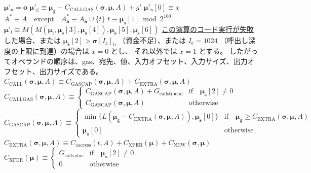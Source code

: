 \documentclass[
]{ltjsarticle}
\begin{document}
\begin{longtable}[]
\(\boldsymbol{\mu}'_{\mathbf{o}} = \mathbf{o}\)
\(\boldsymbol{\mu}'_{\mathrm{g}} \equiv \boldsymbol{\mu}_{\mathrm{g}} - C_{\text{CALLGAS}}(\boldsymbol{\sigma},\boldsymbol{\mu},A) + g'\)
\(\boldsymbol{\mu}'_{\mathbf{s}}[0] \equiv x\)
\(A^{*} \equiv A \quad \text{except} \quad A^{*}_{\mathbf{a}} \equiv A_{\mathbf{a}} \cup \{t\}\)
\(t \equiv \boldsymbol{\mu}_{\mathbf{s}}[1] \bmod 2^{160}\)
\(\boldsymbol{\mu}'_{\mathrm{i}} \equiv M(M(\boldsymbol{\mu}_{\mathrm{i}}, \boldsymbol{\mu}_{\mathbf{s}}[3], \boldsymbol{\mu}_{\mathbf{s}}[4]), \boldsymbol{\mu}_{\mathbf{s}}[5], \boldsymbol{\mu}_{\mathbf{s}}[6])\)
\protect\hyperlink{code_execution_result}{この演算のコード実行が失敗}した場合、または
\(\boldsymbol{\mu}_{\mathbf{s}}[2] > \boldsymbol{\sigma}[I_{\mathrm{a}}]_{\mathrm{b}}\)
（資金不足）、または \(I_{\mathrm{e}} = 1024\)
（呼出し深度の上限に到達）の場合は \(x=0\) とし、 それ以外では \(x=1\)
とする。
したがってオペランドの順序は、gas、宛先、値、入力オフセット、入力サイズ、出力オフセット、出力サイズである。
\(C_{\text{CALL}}(\boldsymbol{\sigma}, \boldsymbol{\mu}, A) \equiv C_{\text{GASCAP}}(\boldsymbol{\sigma}, \boldsymbol{\mu}, A) + C_{\text{EXTRA}}(\boldsymbol{\sigma}, \boldsymbol{\mu}, A)\)
\(C_{\text{CALLGAS}}(\boldsymbol{\sigma}, \boldsymbol{\mu}, A) \equiv \begin{cases} C_{\text{GASCAP}}(\boldsymbol{\sigma}, \boldsymbol{\mu}, A) + G_{\mathrm{callstipend}} & \text{if} \quad \boldsymbol{\mu}_{\mathbf{s}}[2] \neq 0 \\ C_{\text{GASCAP}}(\boldsymbol{\sigma}, \boldsymbol{\mu}, A) & \text{otherwise} \end{cases}\)
\(C_{\text{GASCAP}}(\boldsymbol{\sigma}, \boldsymbol{\mu}, A) \equiv \begin{cases} \min\{ L(\boldsymbol{\mu}_{\mathrm{g}} - C_{\text{EXTRA}}(\boldsymbol{\sigma}, \boldsymbol{\mu}, A)), \boldsymbol{\mu}_{\mathbf{s}}[0] \} & \text{if} \quad \boldsymbol{\mu}_{\mathrm{g}} \ge C_{\text{EXTRA}}(\boldsymbol{\sigma}, \boldsymbol{\mu}, A)\\ \boldsymbol{\mu}_{\mathbf{s}}[0] & \text{otherwise} \end{cases}\)
\(C_{\text{EXTRA}}(\boldsymbol{\sigma}, \boldsymbol{\mu}, A) \equiv C_{\mathrm{aaccess}}(t, A) + C_{\text{XFER}}(\boldsymbol{\mu}) + C_{\text{NEW}}(\boldsymbol{\sigma}, \boldsymbol{\mu})\)
\(C_{\text{XFER}}(\boldsymbol{\mu}) \equiv \begin{cases} G_{\mathrm{callvalue}} & \text{if} \quad \boldsymbol{\mu}_{\mathbf{s}}[2] \neq 0 \\ 0 & \text{otherwise} \end{cases}\)

\end{longtable}
\end{document}
